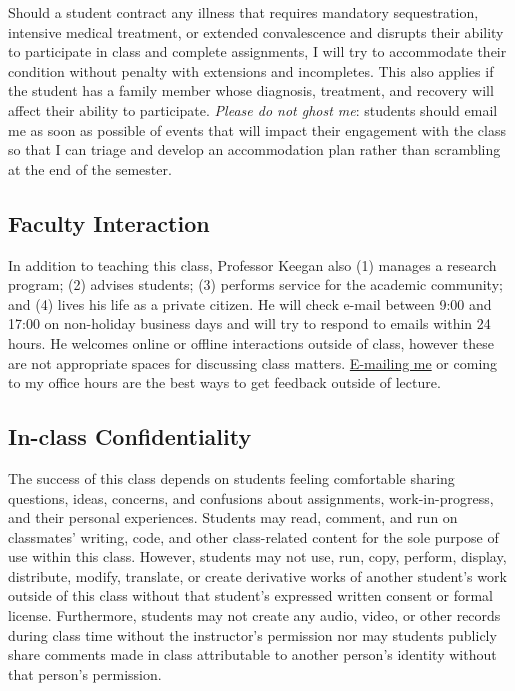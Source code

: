 \documentclass[11pt]{memoir}
\begin{document}
Should a student contract any illness that requires mandatory sequestration, intensive medical treatment, or extended convalescence and disrupts their ability to participate in class and complete assignments, I will try to accommodate their condition without penalty with extensions and incompletes. This also applies if the student has a family member whose diagnosis, treatment, and recovery will affect their ability to participate. \textit{Please do not ghost me}: students should email me as soon as possible of events that will impact their engagement with the class so that I can triage and develop an accommodation plan rather than scrambling at the end of the semester.

\subsection{Faculty Interaction}
In addition to teaching this class, Professor Keegan also (1) manages a research program; (2) advises students; (3) performs service for the academic community; and (4) lives his life as a private citizen. He will check e-mail between 9:00 and 17:00 on non-holiday business days and will try to respond to emails within 24 hours. He welcomes online or offline interactions outside of class, however these are not appropriate spaces for discussing class matters. \href{maito:brian.keegan@colorado.edu}{E-mailing me} or coming to my office hours are the best ways to get feedback outside of lecture.

\subsection{In-class Confidentiality}
The success of this class depends on students feeling comfortable sharing questions, ideas, concerns, and confusions about assignments, work-in-progress, and their personal experiences. Students may read, comment, and run on classmates' writing, code, and other class-related content for the sole purpose of use within this class. However, students may not use, run, copy, perform, display, distribute, modify, translate, or create derivative works of another student's work outside of this class without that student's expressed written consent or formal license. Furthermore, students may not create any audio, video, or other records during class time without the instructor's permission nor may students publicly share comments made in class attributable to another person's identity without that person's permission.
\end{document}
